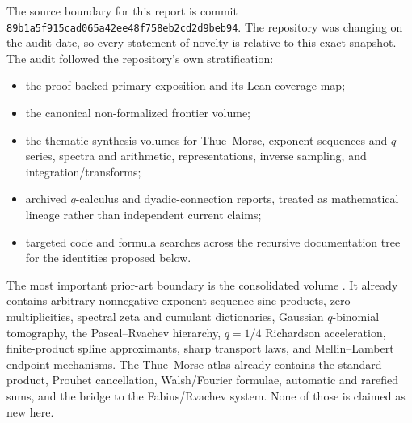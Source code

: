 \documentclass[11pt,oneside]{article}
\numberwithin{equation}{section}
\theoremstyle{definition}
\theoremstyle{remark}
\begin{document}
The source boundary for this report is commit
\texttt{89b1a5f915cad065a42ee48f758eb2cd2d9beb94}.  The repository was changing
on the audit date, so every statement of novelty is relative to this exact
snapshot.  The audit followed the repository's own stratification:
\begin{itemize}
\item the proof-backed primary exposition and its Lean coverage map;
\item the canonical non-formalized frontier volume;
\item the thematic synthesis volumes for Thue--Morse, exponent sequences and
      $q$-series, spectra and arithmetic, representations, inverse sampling,
      and integration/transforms;
\item archived $q$-calculus and dyadic-connection reports, treated as
      mathematical lineage rather than independent current claims;
\item targeted code and formula searches across the recursive documentation
      tree for the identities proposed below.
\end{itemize}

The most important prior-art boundary is the consolidated volume
.
It already contains arbitrary nonnegative exponent-sequence sinc products,
zero multiplicities, spectral zeta and cumulant dictionaries, Gaussian
$q$-binomial tomography, the Pascal--Rvachev hierarchy, $q=1/4$ Richardson
acceleration, finite-product spline approximants, sharp transport laws, and
Mellin--Lambert endpoint mechanisms.  The Thue--Morse atlas already contains
the standard product, Prouhet cancellation, Walsh/Fourier formulae, automatic
and rarefied sums, and the bridge to the Fabius/Rvachev system.  None of those
is claimed as new here.
\end{document}
